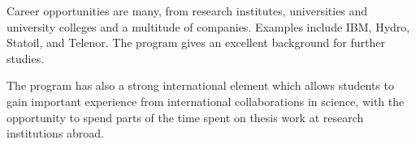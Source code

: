 \documentclass[%
oneside,                 %
final,                   %
10pt]{article}
\begin{document}
Career opportunities are many, from research institutes, universities
and university colleges and a multitude of companies. Examples
include IBM, Hydro, Statoil, and Telenor.  The program gives an
excellent background for further studies.

The program has also a strong international element which allows students to
gain important experience from international collaborations in
science, with the opportunity to spend parts of the time spent on
thesis work at research institutions abroad.



\end{document}
